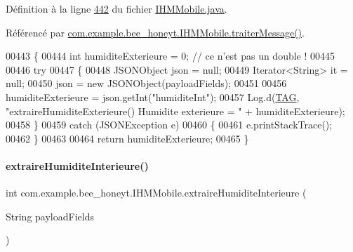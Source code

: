 Définition à la ligne \hyperlink{_i_h_m_mobile_8java_source_l00442}{442} du fichier \hyperlink{_i_h_m_mobile_8java_source}{I\+H\+M\+Mobile.\+java}.



Référencé par \hyperlink{_i_h_m_mobile_8java_source_l00374}{com.\+example.\+bee\+\_\+honeyt.\+I\+H\+M\+Mobile.\+traiter\+Message()}.


\begin{DoxyCode}
00443     \{
00444         \textcolor{keywordtype}{int} humiditeExterieure = 0; \textcolor{comment}{// ce n'est pas un double !}
00445 
00446         \textcolor{keywordflow}{try}
00447         \{
00448             JSONObject json = null;
00449             Iterator<String> it = null;
00450             json = \textcolor{keyword}{new} JSONObject(payloadFields);
00451 
00456             humiditeExterieure = json.getInt(\textcolor{stringliteral}{"humiditeInt"});
00457             Log.d(\hyperlink{classcom_1_1example_1_1bee__honeyt_1_1_i_h_m_mobile_a366987bf9bb2ed1010b2f967d4efa263}{TAG}, \textcolor{stringliteral}{"extraireHumiditeExterieure() Humidite exterieure = "} + humiditeExterieure);
00458         \}
00459         \textcolor{keywordflow}{catch} (JSONException e)
00460         \{
00461             e.printStackTrace();
00462         \}
00463 
00464         \textcolor{keywordflow}{return} humiditeExterieure;
00465     \}
\end{DoxyCode}
\mbox{\label{classcom_1_1example_1_1bee__honeyt_1_1_i_h_m_mobile_afb44a51a66e904c2b3e5229ab5144f56}} 
\paragraph{\texorpdfstring{extraire\+Humidite\+Interieure()}{extraireHumiditeInterieure()}}
{\footnotesize\ttfamily int com.\+example.\+bee\+\_\+honeyt.\+I\+H\+M\+Mobile.\+extraire\+Humidite\+Interieure (\begin{DoxyParamCaption}\item[{String}]{payload\+Fields }\end{DoxyParamCaption})\hspace{0.3cm}{\ttfamily [private]}}

